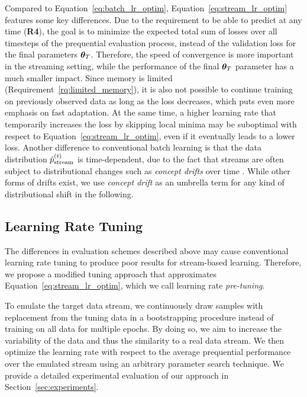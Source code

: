 \documentclass{article} %
\begin{document}
Compared to Equation~\eqref{eq:batch_lr_optim}, Equation~\eqref{eq:stream_lr_optim} features some key differences.
Due to the requirement to be able to predict at any time (\textbf{R4}), the goal is to minimize the expected total sum of losses over all timesteps of the prequential evaluation process, instead of the validation loss for the final parameters ${\bm{\theta}}_T$.
Therefore, the speed of convergence is more important in the streaming setting, while the performance of the final ${\bm{\theta}}_T$ parameter has a much smaller impact.
Since memory is limited (Requirement~\ref{rq:limited_memory}), it is also not possible to continue training on previously observed data as long as the loss decreases, which puts even more emphasis on fast adaptation.
At the same time, a higher learning rate that temporarily increases the loss by skipping local minima may be suboptimal with respect to Equation~\eqref{eq:stream_lr_optim}, even if it eventually leads to a lower loss.
Another difference to conventional batch learning is that the data distribution $\hat{p}_{\rm{stream}}^{(t)}$ is time-dependent, due to the fact that streams are often subject to distributional changes such as \textit{concept drifts} over time \citep{widmerLearningPresenceConcept1996}.
While other forms of drifts exist, we use \textit{concept drift} as an umbrella term for any kind of distributional shift in the following.

\subsection{Learning Rate Tuning}\label{subsec:pre-tuning}

The differences in evaluation schemes described above may cause conventional learning rate tuning to produce poor results for stream-based learning.
Therefore, we propose a modified tuning approach that approximates Equation~\eqref{eq:stream_lr_optim}, which we call learning rate \textit{pre-tuning}.

To emulate the target data stream, we continuously draw samples with replacement from the tuning data in a bootstrapping procedure instead of training on all data for multiple epochs.
By doing so, we aim to increase the variability of the data and thus the similarity to a real data stream.
We then optimize the learning rate with respect to the average prequential performance over the emulated stream using an arbitrary parameter search technique.
We provide a detailed experimental evaluation of our approach in Section~\ref{sec:experiments}.
\end{document}
